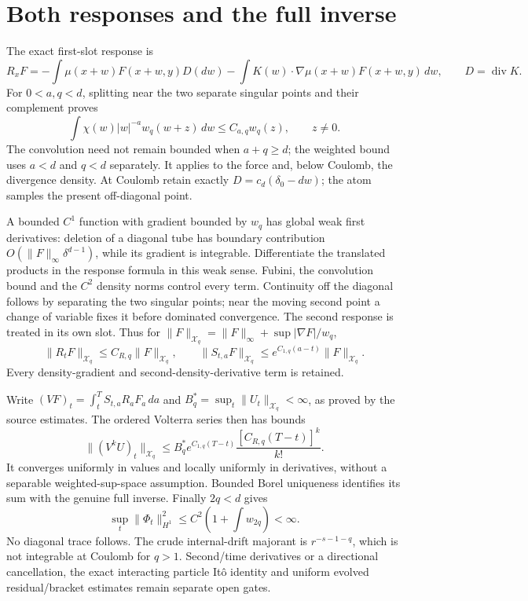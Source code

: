 \documentclass[10pt]{article}
\newcommand{\X}{\mathcal X}
\begin{document}
\section*{Both responses and the full inverse}
The exact first-slot response is
\[
 R_xF=-\int\mu(x+w)F(x+w,y)D(dw)
      -\int K(w)\cdot\nabla\mu(x+w)F(x+w,y)\,dw,
 \qquad D=\operatorname{div}K.
\]
For $0<a,q<d$, splitting near the two separate singular points and their
complement proves
\[
 \int \chi(w)|w|^{-a}w_q(w+z)\,dw\le C_{a,q}w_q(z),\qquad z\ne0.
\]
The convolution need not remain bounded when $a+q\ge d$; the weighted bound
uses $a<d$ and $q<d$ separately. It applies to the force and, below Coulomb,
the divergence density. At Coulomb retain exactly
$D=c_d(\delta_0-dw)$; the atom samples the present off-diagonal point.

A bounded $C^1$ function with gradient bounded by $w_q$ has global weak
first derivatives: deletion of a diagonal tube has boundary contribution
$O(\|F\|_\infty\delta^{d-1})$, while its gradient is integrable. Differentiate
the translated products in the response formula in this weak sense. Fubini,
the convolution bound and the $C^2$ density norms control every term.
Continuity off the diagonal follows by separating the two singular points;
near the moving second point a change of variable fixes it before dominated
convergence. The second response is treated in its own slot. Thus for
$\|F\|_{\X_q}=\|F\|_\infty+\sup|\nabla F|/w_q$,
\[
 \|R_tF\|_{\X_q}\le C_{R,q}\|F\|_{\X_q},\qquad
 \|S_{t,a}F\|_{\X_q}\le e^{C_{1,q}(a-t)}\|F\|_{\X_q}.
\]
Every density-gradient and second-density-derivative term is retained.

Write $(VF)_t=\int_t^T S_{t,a}R_aF_a\,da$ and
$B_q^*=\sup_t\|U_t\|_{\X_q}<\infty$, as proved by the source estimates.
The ordered Volterra series then has bounds
\[
 \|(V^kU)_t\|_{\X_q}\le B_q^* e^{C_{1,q}(T-t)}
       \frac{[C_{R,q}(T-t)]^k}{k!}.
\]
It converges uniformly in values and locally uniformly in derivatives,
without a separable weighted-sup-space assumption. Bounded Borel uniqueness
identifies its sum with the genuine full inverse. Finally $2q<d$ gives
\[
 \sup_t\|\Phi_t\|_{H^1}^2\le C^2\left(1+\int w_{2q}\right)<\infty.
\]
No diagonal trace follows. The crude internal-drift majorant is
$r^{-s-1-q}$, which is not integrable at Coulomb for $q>1$.
Second/time derivatives or a directional cancellation, the exact interacting
particle It\^o identity and uniform evolved residual/bracket estimates remain
separate open gates.
\end{document}
